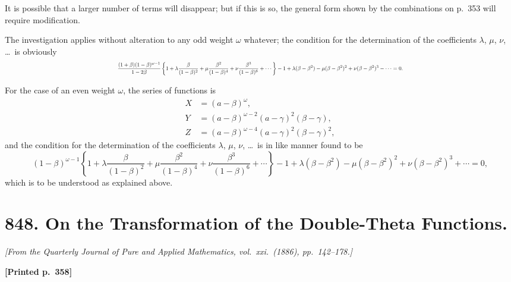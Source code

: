 \documentclass[11pt]{article}
\begin{document}
It is possible that a larger number of terms will disappear; but if this is so, the general form shown by the combinations on p.~353 will require modification.

The investigation applies without alteration to any odd weight $\omega$ whatever; the condition for the determination of the coefficients $\lambda$, $\mu$, $\nu$, \ldots\ is obviously
\[
\resizebox{\textwidth}{!}{$\displaystyle
\frac{(1+\beta)(1-\beta)^{\omega-1}}{1-2\beta}\left\{1+\lambda\frac{\beta}{(1-\beta)^{2}}+\mu\frac{\beta^{2}}{(1-\beta)^{4}}+\nu\frac{\beta^{3}}{(1-\beta)^{6}}+\cdots\right\}
-1+\lambda(\beta-\beta^{2})-\mu(\beta-\beta^{2})^{2}+\nu(\beta-\beta^{2})^{3}-\cdots=0.
$}
\]

For the case of an even weight $\omega$, the series of functions is
\begin{align*}
X &= (a-\beta)^{\omega},\\
Y &= (a-\beta)^{\omega-2}(a-\gamma)^{2}(\beta-\gamma),\\
Z &= (a-\beta)^{\omega-4}(a-\gamma)^{2}(\beta-\gamma)^{2},
\end{align*}
and the condition for the determination of the coefficients $\lambda$, $\mu$, $\nu$, \ldots\ is in like manner found to be
\[
(1-\beta)^{\omega-1}\left\{1+\lambda\frac{\beta}{(1-\beta)^{2}}+\mu\frac{\beta^{2}}{(1-\beta)^{4}}+\nu\frac{\beta^{3}}{(1-\beta)^{6}}+\cdots\right\}
-1+\lambda(\beta-\beta^{2})-\mu(\beta-\beta^{2})^{2}+\nu(\beta-\beta^{2})^{3}+\cdots=0,
\]
which is to be understood as explained above.


\bigskip
\section*{848. On the Transformation of the Double-Theta Functions.}

\noindent\textit{[From the Quarterly Journal of Pure and Applied Mathematics, vol.~xxi.\ (1886), pp.~142--178.]}

\medskip
\noindent\textbf{[Printed p.~358]}\hfill
\end{document}
